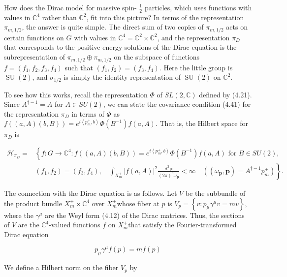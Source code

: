 \documentclass[10pt, letterpaper]{article}
\begin{document}
How does the Dirac model for massive spin- $\frac{1}{2}$ particles, which uses functions with values in $\mathbb{C}^{4}$ rather than $\mathbb{C}^{2}$, fit into this picture? In terms of the representation $\pi_{m, 1 / 2}$, the answer is quite simple. The direct sum of two copies of $\pi_{m, 1 / 2}$ acts on certain functions on $G$ with values in $\mathbb{C}^{4}=\mathbb{C}^{2} \times \mathbb{C}^{2}$, and the representation $\pi_{D}$ that corresponds to the positive-energy solutions of the Dirac equation is the subrepresentation of $\pi_{m, 1 / 2} \oplus \pi_{m, 1 / 2}$ on the subspace of functions $f=\left(f_{1}, f_{2}, f_{3}, f_{4}\right)$ such that $\left(f_{1}, f_{2}\right)=\left(f_{3}, f_{4}\right)$. Here the little group is $\operatorname{SU}(2)$, and $\sigma_{1 / 2}$ is simply the identity representation of $\operatorname{SU}(2)$ on $\mathbb{C}^{2}$.

To see how this works, recall the representation $\Phi$ of $S L(2, \mathbb{C})$ defined by (4.21). Since $A^{\dagger-1}=A$ for $A \in S U(2)$, we can state the covariance condition (4.41) for the representation $\pi_{D}$ in terms of $\Phi$ as $f((a, A)(b, B))=e^{i\left\langle p_{m}^{+}, b\right\rangle} \Phi\left(B^{-1}\right) f(a, A)$. That is, the Hilbert space for $\pi_{D}$ is

$$
\begin{aligned}
\mathcal{H}_{\pi_{D}}= & \left\{f: G \rightarrow \mathbb{C}^{4}: f((a, A)(b, B))=e^{i\left\langle p_{m}^{+}, b\right\rangle} \Phi\left(B^{-1}\right) f(a, A) \text { for } B \in S U(2),\right. \\
& \left.\left(f_{1}, f_{2}\right)=\left(f_{3}, f_{4}\right), \quad \int_{X_{m}^{+}}|f(a, A)|^{2} \frac{d^{3} \mathbf{p}}{(2 \pi)^{3} \omega_{\mathbf{p}}}<\infty \quad\left(\left(\omega_{\mathbf{p}}, \mathbf{p}\right)=A^{\dagger-1} p_{m}^{+}\right)\right\} .
\end{aligned}
$$

The connection with the Dirac equation is as follows. Let $V$ be the subbundle of the product bundle $X_{m}^{+} \times \mathbb{C}^{4}$ over $X_{m}^{+}$whose fiber at $p$ is $V_{p}=\left\{v: p_{\mu} \gamma^{\mu} v=m v\right\}$, where the $\gamma^{\mu}$ are the Weyl form (4.12) of the Dirac matrices. Thus, the sections of $V$ are the $\mathbb{C}^{4}$-valued functions $f$ on $X_{m}^{+}$that satisfy the Fourier-transformed Dirac equation

$$
p_{\mu} \gamma^{\mu} f(p)=m f(p)
$$

We define a Hilbert norm on the fiber $V_{p}$ by
\end{document}
